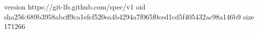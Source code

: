 version https://git-lfs.github.com/spec/v1
oid sha256:689b3958abcff9ca1efcf520ea4b4294a7f065f0ced1cd5f405432ac98a146b9
size 171266
